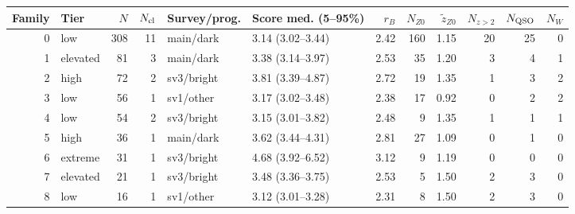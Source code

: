 \begin{ruledtabular}
\begin{tabular}{r l r r l l r r r r r r}
Family & Tier & $N$ & $N_{\rm cl}$ & Survey/prog. & Score med. (5--95\%) & $r_B$ & $N_{Z0}$ & $\tilde z_{Z0}$ & $N_{z>2}$ & $N_{\rm QSO}$ & $N_{W}$ \\
\hline
0 & low & 308 & 11 & main/dark & 3.14 (3.02--3.44) & 2.42 & 160 & 1.15 & 20 & 25 & 0 \\
1 & elevated & 81 & 3 & main/dark & 3.38 (3.14--3.97) & 2.53 & 35 & 1.20 & 3 & 4 & 1 \\
2 & high & 72 & 2 & sv3/bright & 3.81 (3.39--4.87) & 2.72 & 19 & 1.35 & 1 & 3 & 2 \\
3 & low & 56 & 1 & sv1/other & 3.17 (3.02--3.48) & 2.38 & 17 & 0.92 & 0 & 2 & 2 \\
4 & low & 54 & 2 & sv3/bright & 3.15 (3.01--3.82) & 2.48 & 9 & 1.35 & 1 & 1 & 1 \\
5 & high & 36 & 1 & main/dark & 3.62 (3.44--4.31) & 2.81 & 27 & 1.09 & 0 & 1 & 0 \\
6 & extreme & 31 & 1 & sv3/bright & 4.68 (3.92--6.52) & 3.12 & 9 & 1.19 & 0 & 0 & 0 \\
7 & elevated & 21 & 1 & sv3/bright & 3.48 (3.36--3.75) & 2.53 & 5 & 1.50 & 2 & 3 & 0 \\
8 & low & 16 & 1 & sv1/other & 3.12 (3.01--3.28) & 2.31 & 8 & 1.50 & 2 & 3 & 0 \\
\end{tabular}
\end{ruledtabular}
